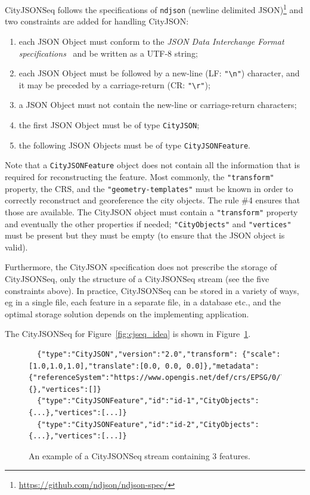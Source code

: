 \documentclass{isprs} %
\begin{document}
%

CityJSONSeq follows the specifications of \texttt{ndjson} (newline delimited JSON)\footnote{\url{https://github.com/ndjson/ndjson-spec/}} and two constraints are added for handling CityJSON\@:
\begin{enumerate}
  \item each JSON Object must conform to the \emph{JSON Data Interchange Format specifications}~\citep{IETF-JSON} and be written as a UTF-8 string;
  \item each JSON Object must be followed by a new-line (LF: \texttt{"\textbackslash n"}) character, and it may be preceded by a carriage-return (CR: \texttt{"\textbackslash r"});
  \item a JSON Object must not contain the new-line or carriage-return characters;
  \item the first JSON Object must be of type \texttt{CityJSON};
  \item the following JSON Objects must be of type \texttt{CityJSONFeature}.
\end{enumerate}

Note that a \texttt{CityJSONFeature} object does not contain all the information that is required for reconstructing the feature. 
Most commonly, the \texttt{"transform"} property, the CRS, and the \texttt{"geometry-templates"} must be known in order to correctly reconstruct and georeference the city objects. 
The rule \#4 ensures that those are available. 
The CityJSON object must contain a \texttt{"transform"} property and eventually the other properties if needed; \texttt{"CityObjects"} and \texttt{"vertices"} must be present but they must be empty (to ensure that the JSON object is valid).

Furthermore, the CityJSON specification does not prescribe the storage of CityJSONSeq, only the structure of a CityJSONSeq stream (see the five constraints above).
In practice, CityJSONSeq can be stored in a variety of ways, eg in a single file, each feature in a separate file, in a database etc., and the optimal storage solution depends on the implementing application.

%

The CityJSONSeq for Figure~\ref{fig:cjseq_idea} is shown in Figure~\ref{fig:stream}.
\begin{figure}
  \begin{lstlisting}
  {"type":"CityJSON","version":"2.0","transform": {"scale":[1.0,1.0,1.0],"translate":[0.0, 0.0, 0.0]},"metadata":{"referenceSystem":"https://www.opengis.net/def/crs/EPSG/0/7415"},"CityObjects":{},"vertices":[]}
  {"type":"CityJSONFeature","id":"id-1","CityObjects":{...},"vertices":[...]} 
  {"type":"CityJSONFeature","id":"id-2","CityObjects":{...},"vertices":[...]} 
  \end{lstlisting}
\caption{An example of a CityJSONSeq stream containing 3 features.}%
\label{fig:stream}
\end{figure}
\end{document}
